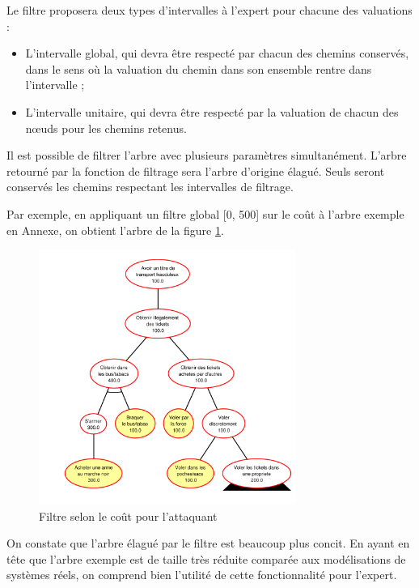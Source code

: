 		Le filtre proposera deux types d'intervalles à l'expert pour chacune des valuations :
		\begin{itemize}
			\item L'intervalle global, qui devra être respecté par chacun des chemins conservés, dans le sens où la valuation du chemin dans son ensemble rentre dans l'intervalle ;
			\item L'intervalle unitaire, qui devra être respecté par la valuation de chacun des nœuds pour les chemins retenus.
		\end{itemize} %

		Il est possible de filtrer l'arbre avec plusieurs paramètres simultanément.
		L'arbre retourné par la fonction de filtrage sera l'arbre d'origine élagué. Seuls seront conservés les chemins respectant les intervalles de filtrage.
		
		Par exemple, en appliquant un filtre global [0, 500] sur le coût à l'arbre exemple en Annexe, on obtient l'arbre de la figure \ref{fig:arbre_post_filtre}.

		\begin{figure}[h!]
			\begin{center}
				\includegraphics[width=0.75\textwidth]{figure/post_filtre.pdf}
			\end{center}
			\caption{Filtre selon le coût pour l'attaquant}
			\label{fig:arbre_post_filtre}
		\end{figure}

		On constate que l'arbre élagué par le filtre est beaucoup plus concit. En ayant en tête que l'arbre exemple est de taille très réduite comparée aux modélisations de systèmes réels, on comprend bien l'utilité de cette fonctionnalité pour l'expert.   

